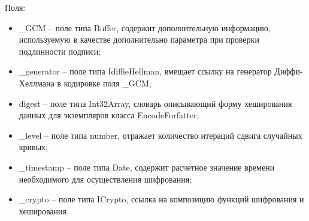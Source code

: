 Поля:
\begin{itemize}
  \item \_GCM – поле типа Buffer, содержит дополнительную информацию, используемую в качестве дополнительно параметра при проверки подлинности подписи;
  \item \_generator – поле типа IdiffieHellman, вмещает ссылку на генератор  Диффи-Хеллмана в кодировке поля \_GCM;
  \item digest – поле типа Int32Array, словарь описывающий форму хеширования данных для экземпляров класса EncodeForfatter;
  \item \_level – поле типа number, отражает количество итераций сдвига случайных кривых;
  \item \_timestamp – поле типа Date, содержит расчетное значение времени необходимого для осуществления шифрования;
  \item \_crypto – поле типа ICrypto, ссылка на композицию функций шифрования и хеширования.
\end{itemize}

